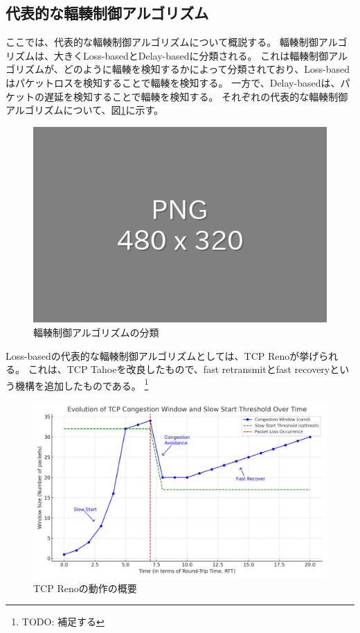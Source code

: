 \documentclass[a4paper,11pt]{jreport}
\newcommand{\figref}[1]{図\ref{#1}}
\begin{document}
\subsection{代表的な輻輳制御アルゴリズム}

ここでは、代表的な輻輳制御アルゴリズムについて概説する。
輻輳制御アルゴリズムは、大きくLoss-basedとDelay-basedに分類される。
これは輻輳制御アルゴリズムが、どのように輻輳を検知するかによって分類されており、Loss-basedはパケットロスを検知することで輻輳を検知する。
一方で、Delay-basedは、パケットの遅延を検知することで輻輳を検知する。
それぞれの代表的な輻輳制御アルゴリズムについて、\figref{figure:congestion_control_classification}に示す。

\begin{figure}[htbp]
  \centering
  \includegraphics[width=0.6\linewidth]{fig/chap02/empty.png}
  \caption{輻輳制御アルゴリズムの分類}
  \label{figure:congestion_control_classification}
\end{figure}

Loss-basedの代表的な輻輳制御アルゴリズムとしては、TCP Reno\cite{reno,tcp}が挙げられる。
これは、TCP Tahoe\cite{congestion-avoidance}を改良したもので、fast retransmitとfast recoveryという機構を追加したものである。
\footnote{TODO: 補足する}

\begin{figure}[htbp]
  \centering
  \includegraphics[width=0.6\linewidth]{fig/chap02/CongestionControlAlgorithm_Timeline.png}
  \caption{TCP Renoの動作の概要}
  \label{figure:reno-timeline}
\end{figure}
\end{document}
